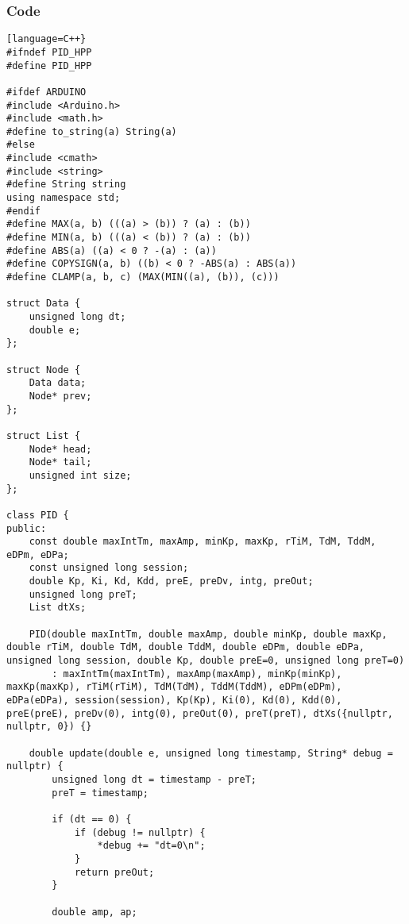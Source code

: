 \documentclass[a4paper,12pt]{report}
\begin{document}
\subsubsection{Code}
\begin{lstlisting}[language=C++}
#ifndef PID_HPP
#define PID_HPP

#ifdef ARDUINO
#include <Arduino.h>
#include <math.h>
#define to_string(a) String(a)
#else
#include <cmath>
#include <string>
#define String string
using namespace std;
#endif
#define MAX(a, b) (((a) > (b)) ? (a) : (b))
#define MIN(a, b) (((a) < (b)) ? (a) : (b))
#define ABS(a) ((a) < 0 ? -(a) : (a))
#define COPYSIGN(a, b) ((b) < 0 ? -ABS(a) : ABS(a))
#define CLAMP(a, b, c) (MAX(MIN((a), (b)), (c)))

struct Data {
    unsigned long dt;
    double e;
};

struct Node {
    Data data;
    Node* prev;
};

struct List {
    Node* head;
    Node* tail;
    unsigned int size;
};

class PID {
public:
    const double maxIntTm, maxAmp, minKp, maxKp, rTiM, TdM, TddM, eDPm, eDPa;
    const unsigned long session;
    double Kp, Ki, Kd, Kdd, preE, preDv, intg, preOut;
    unsigned long preT;
    List dtXs;

    PID(double maxIntTm, double maxAmp, double minKp, double maxKp, double rTiM, double TdM, double TddM, double eDPm, double eDPa, unsigned long session, double Kp, double preE=0, unsigned long preT=0)
        : maxIntTm(maxIntTm), maxAmp(maxAmp), minKp(minKp), maxKp(maxKp), rTiM(rTiM), TdM(TdM), TddM(TddM), eDPm(eDPm), eDPa(eDPa), session(session), Kp(Kp), Ki(0), Kd(0), Kdd(0), preE(preE), preDv(0), intg(0), preOut(0), preT(preT), dtXs({nullptr, nullptr, 0}) {}

    double update(double e, unsigned long timestamp, String* debug = nullptr) {
        unsigned long dt = timestamp - preT;
        preT = timestamp;

        if (dt == 0) {
            if (debug != nullptr) {
                *debug += "dt=0\n";
            }
            return preOut;
        }

        double amp, ap;


\end{lstlisting}
\end{document}
